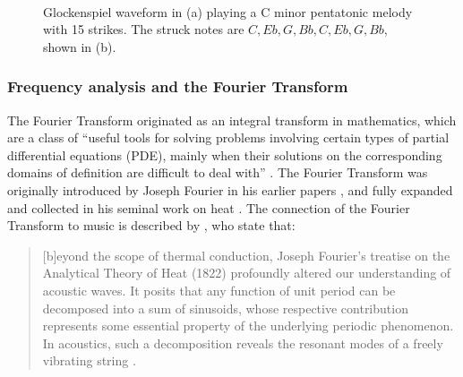 \documentclass[report.tex]{subfiles}
\begin{document}
\begin{figure}[ht]
	\centering
	\\
	\caption{Glockenspiel waveform in (a) playing a C minor pentatonic melody with 15 strikes. The struck notes are $C, Eb, G, Bb, C, Eb, G, Bb$, shown in (b).}
	\label{fig:glockwaveform}
\end{figure}

\subsubsection{Frequency analysis and the Fourier Transform}
\label{sec:freqanal}

The Fourier Transform originated as an integral transform in mathematics, which are a class of ``useful tools for solving problems involving certain types of partial differential equations (PDE), mainly when their solutions on the corresponding domains of definition are difficult to deal with'' \parencite[54]{fourierhistory}. The Fourier Transform was originally introduced by Joseph Fourier in his earlier papers \parencite{fourierhist1, fourierhist2}, and fully expanded and collected in his seminal work on heat \parencite{fourierheat}. The connection of the Fourier Transform to music is described by \citeauthor{fouriermusic}, who state that:

\begin{quote}
	[b]eyond the scope of thermal conduction, Joseph Fourier's treatise on the Analytical Theory of Heat (1822) profoundly altered our understanding of acoustic waves. It posits that any function of unit period can be decomposed into a sum of sinusoids, whose respective contribution represents some essential property of the underlying periodic phenomenon. In acoustics, such a decomposition reveals the resonant modes of a freely vibrating string \parencite[461]{fouriermusic}.
\end{quote}
\end{document}
